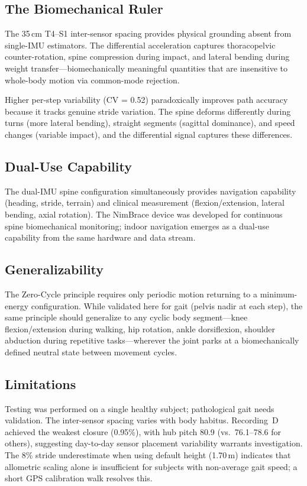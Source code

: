 \documentclass[11pt,a4paper]{article}
\begin{document}
\subsection{The Biomechanical Ruler}

The 35\,cm T4--S1 inter-sensor spacing provides physical grounding absent from
single-IMU estimators. The differential acceleration captures thoracopelvic
counter-rotation, spine compression during impact, and lateral bending during
weight transfer---biomechanically meaningful quantities that are insensitive to
whole-body motion via common-mode rejection.

Higher per-step variability (CV = 0.52) paradoxically improves path accuracy
because it tracks genuine stride variation. The spine deforms differently
during turns (more lateral bending), straight segments (sagittal dominance),
and speed changes (variable impact), and the differential signal captures
these differences.

\subsection{Dual-Use Capability}

The dual-IMU spine configuration simultaneously provides navigation capability
(heading, stride, terrain) and clinical measurement (flexion/extension, lateral
bending, axial rotation). The NimBrace device was developed for continuous
spine biomechanical monitoring; indoor navigation emerges as a dual-use
capability from the same hardware and data stream.

\subsection{Generalizability}

The Zero-Cycle principle requires only periodic motion returning to a
minimum-energy configuration. While validated here for gait (pelvis nadir at
each step), the same principle should generalize to any cyclic body
segment---knee flexion/extension during walking, hip rotation, ankle
dorsiflexion, shoulder abduction during repetitive tasks---wherever the joint
parks at a biomechanically defined neutral state between movement cycles.

\subsection{Limitations}

Testing was performed on a single healthy subject; pathological gait needs
validation. The inter-sensor spacing varies with body habitus. Recording~D
achieved the weakest closure (0.95\%), with hub pitch 80.9\textdegree{}
(vs.\ 76.1--78.6\textdegree{} for others), suggesting day-to-day sensor
placement variability warrants investigation. The 8\% stride underestimate
when using default height (1.70\,m) indicates that allometric scaling alone is
insufficient for subjects with non-average gait speed; a short GPS calibration
walk resolves this.
\end{document}
